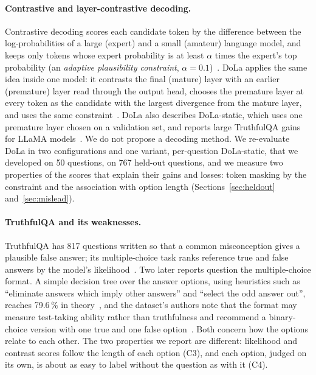 \documentclass[11pt]{article}
\newcommand{\cha}[1]{\textsf{C#1}}
\newcommand{\method}{per-question DoLa-static}
\begin{document}
\paragraph{Contrastive and layer-contrastive decoding.}
Contrastive decoding scores each candidate token by the difference between the log-probabilities of a large
(expert) and a small (amateur) language model, and keeps only tokens whose expert probability is at least $\alpha$
times the expert's top probability (an \emph{adaptive plausibility constraint}, $\alpha =
0.1$)~\citep{li2023contrastive}. DoLa applies the same idea inside one model: it contrasts the final (mature)
layer with an earlier (premature) layer read through the output head, chooses the premature layer at every token
as the candidate with the largest divergence from the mature layer, and uses the same
constraint~\citep{chuang2024dola}. DoLa also describes DoLa-static, which uses one premature layer chosen on a
validation set, and reports large TruthfulQA gains for LLaMA models~\citep{chuang2024dola}. We do not propose a
decoding method. We re-evaluate DoLa in two configurations and one variant, \method{}, that we developed on 50
questions, on 767 held-out questions, and we measure two properties of the scores that explain their gains and
losses: token masking by the constraint and the association with option length (Sections~\ref{sec:heldout}
and~\ref{sec:mislead}).

\paragraph{TruthfulQA and its weaknesses.}
TruthfulQA has 817 questions written so that a common misconception gives a plausible false answer; its
multiple-choice task ranks reference true and false answers by the model's likelihood~\citep{lin2022truthfulqa}.
Two later reports question the multiple-choice format. A simple decision tree over the answer options, using
heuristics such as ``eliminate answers which imply other answers'' and ``select the odd answer out'', reaches 79.6\,\%
in theory~\citep{turner2025gaming}, and the dataset's authors note that the format may measure test-taking ability
rather than truthfulness and recommend a binary-choice version with one true and one false
option~\citep{evans2025improved}. Both concern how the options relate to each other. The two properties we report
are different: likelihood and contrast scores follow the length of each option (\cha3), and each option, judged on its
own, is about as easy to label without the question as with it (\cha4).
\end{document}
